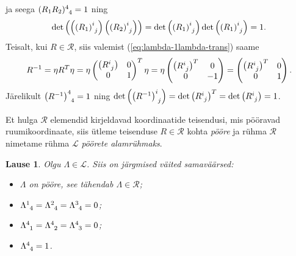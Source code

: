 \documentclass[12pt,a4paper,oneside]{article}
\theoremstyle{plain}
\newtheorem{lause}{Lause}[section]
\theoremstyle{definition}
\numberwithin{equation}{section}
\def\L{{\mathcal L}}
\begin{document}
ja seega $(R_1 R_2)\indices{^4_4} = 1$ ning 
\[\det \left(\left(\left(R_1\right)\indices{^i_j}\right) 
\left(\left(R_2\right)\indices{^i_j}\right) \right) = 
\det \left(\left(R_1\right)\indices{^i_j}\right) \det 
\left(\left(R_1\right)\indices{^i_j}\right) = 1.\]
Teisalt, kui $R \in \mathcal{R}$, siis valemist 
(\ref{eq:lambda-1lambda-trans}) saame
\begin{align*}
R^{-1} = \eta R^T \eta = \eta \begin{pmatrix}
\left(R\indices{^i_j}\right) & 0 \\ 
0 & 1 \\ \end{pmatrix}^T \eta = 
\eta \begin{pmatrix}
\left(R\indices{^i_j}\right)^T & 0 \\ 
0 & -1 \\ \end{pmatrix} = \begin{pmatrix}
\left(R\indices{^i_j}\right)^T & 0 \\ 
0 & 1 \\ \end{pmatrix}.
\end{align*}
Järelikult $\left(R^{-1}\right)\indices{^4_4} = 1$ ning 
$\det \left(\left(R^{-1}\right)\indices{^i_j}\right) = 
\det \left(R\indices{^i_j}\right)^T = \det 
\left(R\indices{^i_j}\right) = 1$.

Et hulga $\mathcal{R}$ elemendid kirjeldavad koordinaatide 
teisendusi, mis pööravad ruumikoordinaate, siis ütleme teisenduse 
$R \in \mathcal{R}$ kohta \emph{pööre} ja rühma $\mathcal{R}$ 
nimetame rühma $\L$ \emph{pöörete alamrühmaks}.

\begin{lause} \label{lause:rotation}
Olgu $\Lambda \in \L$. Siis on järgmised väited samaväärsed:
\begin{itemize}
\item[\emph{(i)}] $\Lambda$ on pööre, see tähendab $\Lambda \in 
\mathcal{R}$;
\item[\emph{(ii)}] $\Lambda\indices{^1_4} = \Lambda\indices{^2_4} = 
\Lambda\indices{^3_4} = 0$;
\item[\emph{(iii)}] $\Lambda\indices{^4_1} = \Lambda\indices{^4_2} = 
\Lambda\indices{^4_3} = 0$;
\item[\emph{(iv)}] $\Lambda\indices{^4_4} = 1$.
\end{itemize}
\end{lause}
\end{document}
